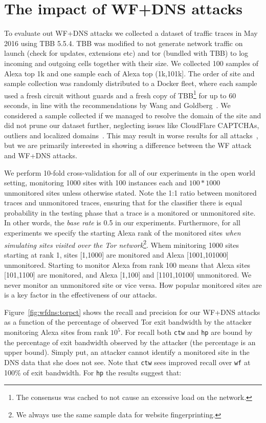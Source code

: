\section{The impact of WF+DNS attacks}
\label{sec:analysis}
To evaluate out WF+DNS attacks we collected a dataset of traffic traces in May
2016 using TBB 5.5.4.
TBB was modified to not generate network traffic on launch (check for
updates, extensions etc) and
tor (bundled with TBB) to log incoming and outgoing cells together with
their size. We collected 100 samples of Alexa top 1k and one sample each of
Alexa top (1k,101k]. The order of site and sample collection was randomly
distributed to a Docker fleet, where each sample used a fresh circuit without
guards and a fresh copy of TBB\footnote{The consensus was cached to not
cause an excessive load on the network.} for up to 60 seconds,
in line with the recommendations by Wang and Goldberg~\cite{Wang2013a}.
We considered a sample collected if we managed to resolve the domain of the site
and did not prune our dataset further, neglecting issues like CloudFlare
CAPTCHAs, outliers and localized domains~\cite{Juarez2014a}. This may result
in worse results for all attacks~\cite{Wang2013a}, but we are primarily
interested in showing a difference between the WF attack and WF+DNS attacks.

We perform 10-fold cross-validation for all of our experiments in the open
world setting, monitoring 1000 sites with 100 instances each and
$100*1000$ unmonitored sites unless otherwise stated.
Note the 1:1 ratio between monitored traces and unmonitored traces,
ensuring that for the classifier there is equal probability in the testing
phase that a trace is a monitored or unmonitored site.
In other words, the \emph{base rate} is 0.5 in our experiments.
Furthermore, for all experiments we specify the starting Alexa rank of the
monitored sites
\emph{when simulating sites visited over the Tor network}\footnote{We always
use the same sample data for website fingerprinting.}.
Whem minitoring 1000 sites starting at rank 1, sites
[1,1000] are monitored and Alexa [1001,101000] unmonitored. Starting to
monitor Alexa from rank 100 means that Alexa sites [101,1100] are monitored,
and Alexa [1,100] and [1101,10100] unmonitored.
We never monitor an unmonitored site or vice versa.
How popular monitored sites
are is a key factor in the effectiveness of our attacks.

Figure~\ref{fig:wfdns:torpct} shows the recall and precision for our WF+DNS
attacks as a function of the percentage of observed Tor exit bandwidth by the
attacker monitoring Alexa sites from rank $10^5$.
For recall both \texttt{ctw} and \texttt{hp} are bound by the
percentage of exit bandwidth observed by the attacker (the percentage is an
upper bound).
Simply put, an attacker cannot identify a monitored site in the DNS data that
she does not see. Note that \texttt{ctw} sees improved recall over \texttt{wf}
at 100\% of exit bandwidth. For \texttt{hp} the results suggest that:

